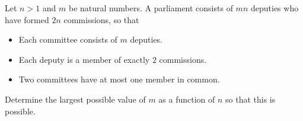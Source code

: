 Let $n>1$ and $m$ be natural numbers.
A parliament consists of $mn$ deputies who have formed $2n$ commissions, so that
\begin{itemize}
    \item Each committee consists of $m$ deputies.
    \item Each deputy is a member of exactly $2$ commissions.
    \item Two committees have at most one member in common.
\end{itemize}
Determine the largest possible value of $m$ as a function of $n$ so that this is possible.
